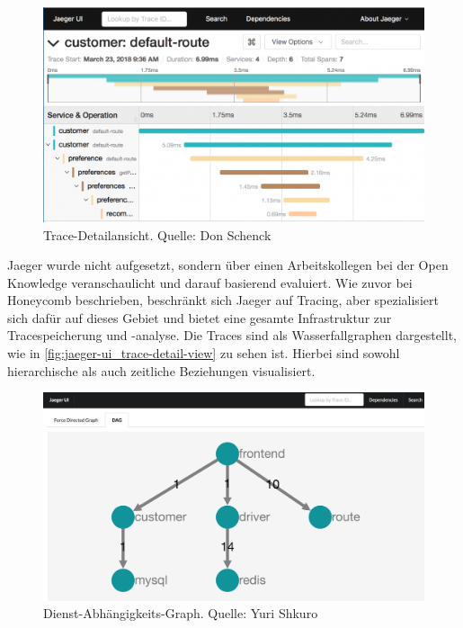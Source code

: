 \begin{figure}
\centering
\vspace{-\baselineskip}
\includegraphics[width=\linewidth]{img/03_methoden/redhat_jaeger-ui_trace-detail-view.png}
\caption{Trace-Detailansicht. Quelle: Don Schenck \cite{JaegerIstioTracing}}
\label{fig:jaeger-ui_trace-detail-view}
\end{figure}

Jaeger wurde nicht aufgesetzt, sondern über einen Arbeitskollegen bei der Open Knowledge veranschaulicht und darauf basierend evaluiert. Wie zuvor bei Honeycomb beschrieben, beschränkt sich Jaeger auf Tracing, aber spezialisiert sich dafür auf dieses Gebiet und bietet eine gesamte Infrastruktur zur Tracespeicherung und -analyse. Die Traces sind als Wasserfallgraphen dargestellt, wie in \autoref{fig:jaeger-ui_trace-detail-view} zu sehen ist. Hierbei sind sowohl hierarchische als auch zeitliche Beziehungen visualisiert.

\begin{figure}
\centering
\vspace{-\baselineskip}
\includegraphics[width=\linewidth]{img/03_methoden/medium_jaeger-ui_dependency-graph.png}
\caption{Dienst-Abhängigkeits-Graph. Quelle: Yuri Shkuro \cite{JaegerTakeOpenTracingForARide}}
\label{fig:jaeger-ui_dependency-graph}
\end{figure}


